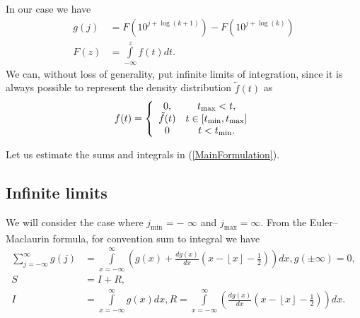 \documentclass[titlepage,fleqn]{article}%
\begin{document}
In our case we have%
\begin{align*}
g(j)  &  =F(10^{j+\log(k+1)})-F(10^{j+\log(k)})\\
F(z)  &  =%
{\displaystyle\int\limits_{-\infty}^{z}}
f(t)dt.
\end{align*}
We can, without loss of generality, put infinite limits of integration, since
it is always possible to represent the density distribution $\tilde{f}(t)$ as%
\begin{equation}
f(t)=\left\{
\begin{array}
[c]{cc}%
0, & t_{\max}<t,\\
\tilde{f}(t) & t\in\lbrack t_{\min},t_{\max}]\\
0 & t<t_{\min}.
\end{array}
\right.  \label{EM00x}%
\end{equation}


Let us estimate the sums and integrals in (\ref{MainFormulation}).

\subsection{Infinite limits}%

\label{InfinitLimit}%
We will consider the case where $j_{\min_{{}}}=-$ $\infty$ and $j_{\max
}=\infty.$ From the Euler--Maclaurin formula, for convention sum to integral
we have%
\begin{align}%
{\displaystyle\sum\limits_{j=-\infty}^{\infty}}
g(j)  &  =%
{\displaystyle\int\limits_{x=-\infty}^{\infty}}
\left(  g(x)+\frac{dg(x)}{dx}\left(  x-\left\lfloor x\right\rfloor -\frac
{1}{2}\right)  \right)  dx,g(\pm\infty)=0,\label{EM1}\\
S  &  =I+R,\nonumber\\
I  &  =%
{\displaystyle\int\limits_{x=-\infty}^{\infty}}
g(x)dx,R=%
{\displaystyle\int\limits_{x=-\infty}^{\infty}}
\left(  \frac{dg(x)}{dx}\left(  x-\left\lfloor x\right\rfloor -\frac{1}%
{2}\right)  \right)  dx.\nonumber
\end{align}
\end{document}
